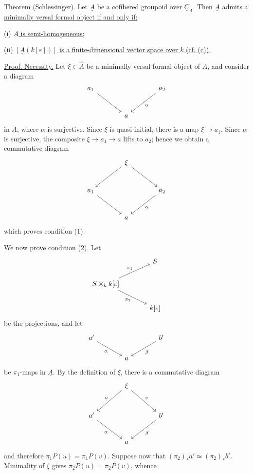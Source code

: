 
\underline{Theorem  (Schlessinger). Let $\underline A$ be a
cofibered groupoid over $\underline C_\Lambda$. Then $\underline A$
admits a minimally versal formal object if and only if:}


(i) \underline{$\underline A$ is semi-homogeneous;}

(ii) \underline{$[\underline A(k[\varepsilon])]$ is a
finite-dimensional vector space over $k$ (cf. (c)).}

\underline{Proof. Necessity.} Let $\xi\in\widehat{\underline A}$ be a
minimally versal formal object of $\underline A$, and consider a
diagram
\[
\begin{tikzcd}[column sep=large,row sep=large]
a_1 \arrow[dr] & & a_2 \arrow[dl,"\alpha"] \\
& a &
\end{tikzcd}
\]
in $\underline A$, where $\alpha$ is surjective. Since $\xi$ is
quasi-initial, there is a map $\xi\longrightarrow a_1$. Since
$\alpha$ is surjective, the composite
$\xi\longrightarrow a_1\longrightarrow a$ lifts to $a_2$; hence we
obtain a commutative diagram
\[
\begin{tikzcd}[column sep=large,row sep=large]
& \xi \arrow[dl] \arrow[dr] & \\
a_1 \arrow[dr] & & a_2 \arrow[dl,"\alpha"] \\
& a &
\end{tikzcd}
\]
which proves condition (1).

We now prove condition (2). Let
\[
\begin{tikzcd}[column sep=large]
& S \\
S\times_k k[\varepsilon]
 \arrow[ur,"\pi_1"] \arrow[dr,"\pi_2"'] & \\
& k[\varepsilon]
\end{tikzcd}
\]
be the projections, and let
\[
\begin{tikzcd}[column sep=large]
a' \arrow[dr,"\alpha"'] & & b' \arrow[dl,"\beta"] \\
& a &
\end{tikzcd}
\]
be $\pi_1$-maps in $\underline A$. By the definition of $\xi$, there
is a commutative diagram
\[
\begin{tikzcd}[column sep=large,row sep=large]
& \xi \arrow[dl,"u"'] \arrow[dr,"v"] & \\
a' \arrow[dr,"\alpha"'] & & b' \arrow[dl,"\beta"] \\
& a &
\end{tikzcd}
\]
and therefore $\pi_1P(u)=\pi_1P(v)$. Suppose now that
$(\pi_2)_*a'\simeq(\pi_2)_*b'$. Minimality of $\xi$ gives
$\pi_2P(u)=\pi_2P(v)$, whence


